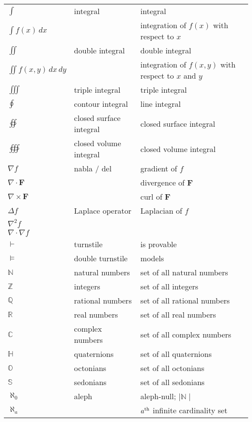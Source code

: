\documentclass{article}
\begin{document}
\begin{longtable}{|| L{1.7cm} | L{3.5cm} | L{7cm} ||}
\hline
\(\int\) & integral & integral\\
\(\int f(x)\,dx\) & & integration of \(f(x)\) with respect to \(x\)\\
\hline
\(\iint\) & double integral & double integral\\
\(\iint f(x,y)\,dx\,dy\) & & integration of \(f(x,y)\) with respect to \(x\) and \(y\)\\
\hline
\(\iiint\) & triple integral & triple integral\\
\hline
\(\oint\) & contour integral & line integral\\
\hline
\(\oiint\) & closed surface integral & closed surface integral\\
\hline
\(\oiiint\) & closed volume integral & closed volume integral\\
\hline
\(\nabla{f}\) & nabla / del & gradient of \(f\)\\
\(\nabla\cdot\textbf{F}\) & & divergence of \(\textbf{F}\)\\
\(\nabla\times\textbf{F}\) & & curl of \(\textbf{F}\)\\
\hline
\(\Delta{f}\) & Laplace operator & Laplacian of \(f\)\\
\(\nabla^{2}f\) & & \\
\(\nabla\cdot\nabla{f}\) & & \\
\hline
\(\vdash\) & turnstile & is provable\\
\hline
\(\models\) & double turnstile & models\\
\hline
\(\mathbb{N}\) & natural numbers & set of all natural numbers\\
\hline
\(\mathbb{Z}\) & integers & set of all integers\\
\hline
\(\mathbb{Q}\) & rational numbers & set of all rational numbers\\
\hline
\(\mathbb{R}\) & real numbers & set of all real numbers\\
\hline
\(\mathbb{C}\) & complex numbers & set of all complex numbers\\
\hline
\(\mathbb{H}\) & quaternions & set of all quaternions\\
\hline
\(\mathbb{O}\) & octonians & set of all octonians\\
\hline
\(\mathbb{S}\) & sedonians & set of all sedonians\\
\hline
\(\aleph_{0}\) & aleph & aleph-null; \(\mid\mathbb{N}\mid\)\\
\(\aleph_{a}\) & & \(a\textsuperscript{th}\) infinite cardinality set\\
\hline

\end{longtable}
\end{document}
